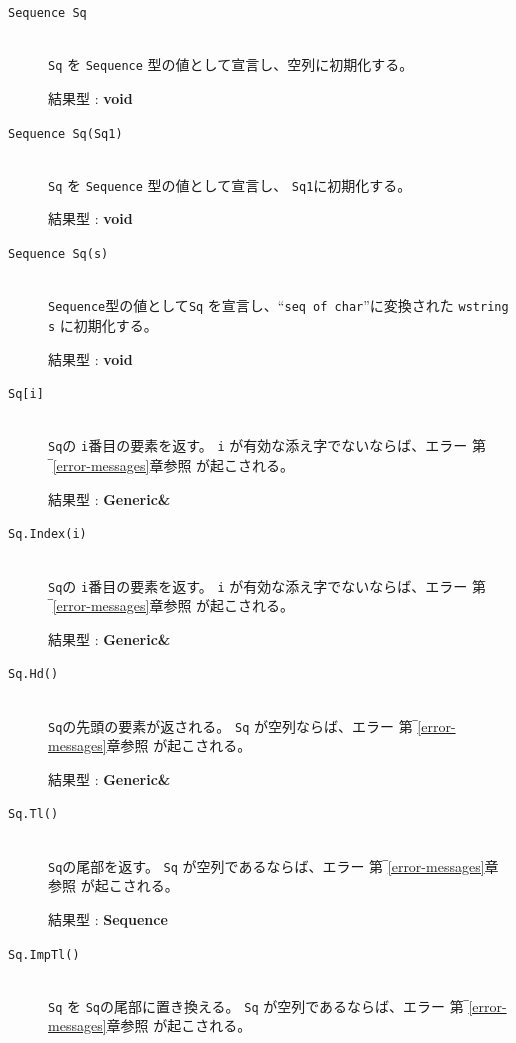 \documentclass[\pformat,12pt]{jarticle}
\begin{document}
\begin{description}
\item[{\tt Sequence Sq}] \mbox{}\\
     {\tt Sq} を {\tt Sequence} 型の値として宣言し、空列に初期化する。

     結果型 : {\bf void}

\item[{\tt Sequence Sq(Sq1)}] \mbox{}\\
      {\tt Sq} を {\tt Sequence} 型の値として宣言し、 {\tt Sq1}に初期化する。

     結果型 : {\bf void}

\item[{\tt Sequence Sq(s)}] \mbox{}\\
     {\tt Sequence}型の値として{\tt Sq} を宣言し、``{\tt seq of char}''に変換された  {\tt wstring} {\tt s} に初期化する。

     結果型 : {\bf void}

\item[{\tt Sq[i]}] \mbox{}\\     
     {\tt Sq}の {\tt i}番目の要素を返す。 
 {\tt i} が有効な添え字でないならば、エラー 第‾\ref{error-messages}章参照 が起こされる。

     結果型 : {\bf Generic\&}

\item[{\tt Sq.Index(i)}] \mbox{}\\     
      {\tt Sq}の {\tt i}番目の要素を返す。
 {\tt i} が有効な添え字でないならば、エラー 第‾\ref{error-messages}章参照 が起こされる。

     結果型 : {\bf Generic\&}

\item[{\tt Sq.Hd()}] \mbox{}\\     
      {\tt Sq}の先頭の要素が返される。 {\tt Sq} が空列ならば、エラー 第‾\ref{error-messages}章参照 が起こされる。

     結果型 : {\bf Generic\&}

\item[{\tt Sq.Tl()}] \mbox{}\\     
      {\tt Sq}の尾部を返す。 
 {\tt Sq} が空列であるならば、エラー 第‾\ref{error-messages}章参照 が起こされる。

     結果型 : {\bf Sequence}

\item[{\tt Sq.ImpTl()}] \mbox{}\\     
      {\tt Sq} を {\tt Sq}の尾部に置き換える。
 {\tt Sq} が空列であるならば、エラー 第‾\ref{error-messages}章参照 が起こされる。


\end{description}
\end{document}
